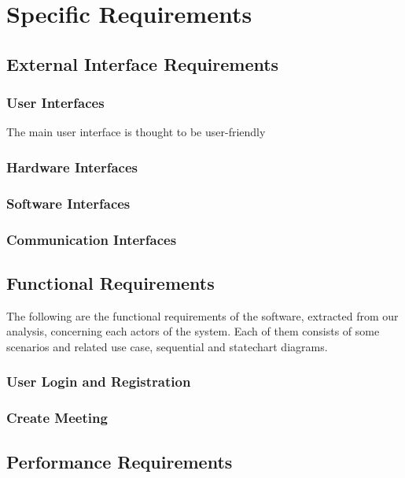 \chapter{Specific Requirements}
\label{cha:requirements}

\section{External Interface Requirements}
\label{sec:ex_req}

\subsection{User Interfaces}
The main user interface is thought to be user-friendly 
\subsection{Hardware Interfaces}
\subsection{Software Interfaces}
\subsection{Communication Interfaces}

\section{Functional Requirements}
\label{sec:func_req}
The following are the functional requirements of the software, extracted from our analysis, concerning each actors of the system. Each of them consists of some scenarios and related use case, sequential and statechart diagrams.

\subsection*{User Login and Registration}


\subsection*{Create Meeting}


\section{Performance Requirements}
\label{sec:perf_req}


